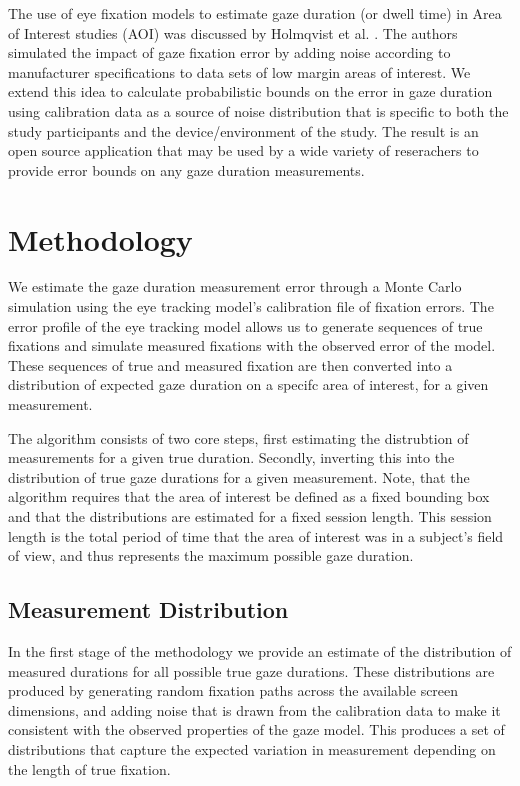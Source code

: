 \documentclass[sigconf]{acmart}
\numberwithin{equation}{section}
\begin{document}
The use of eye fixation models to estimate gaze duration (or dwell time) in Area of
Interest studies (AOI) was discussed by Holmqvist et al. \cite{Holmqvist2012}. The
authors simulated the impact of gaze fixation error by adding noise according to
manufacturer specifications to data sets of low margin areas of interest. We extend 
this idea to calculate probabilistic bounds on the error in gaze duration using
calibration data as a source of noise distribution that is specific to both the
study participants and the device/environment of the study. The result is an open
source application that may be used by a wide variety of reserachers to provide
error bounds on any gaze duration measurements.

\section{Methodology}

We estimate the gaze duration measurement error through a Monte Carlo simulation
using the eye tracking model's calibration file of fixation errors.
The error profile of the eye tracking model allows us to generate sequences of true
fixations and simulate measured fixations with the observed error of the model.
These sequences of true and measured fixation are then converted into a distribution
of expected gaze duration on a specifc area of interest, for a given measurement. 

The algorithm consists of two core steps, first estimating the distrubtion of measurements
for a given true duration. Secondly, inverting this into the distribution of true
gaze durations for a given measurement. Note, that the algorithm requires that the area of
interest be defined as a fixed bounding box and that the distributions are estimated for
a fixed session length. This session length is the total period of time that the area of
interest was in a subject's field of view, and thus represents the maximum possible gaze
duration.

\subsection{Measurement Distribution}

In the first stage of the methodology we provide an estimate of the distribution of measured
durations for all possible true gaze durations. These distributions are produced by generating
random fixation paths across the available screen dimensions, and adding noise that is 
drawn from the calibration data to make it consistent with the observed properties of the gaze model.
This produces a set of distributions that capture the expected
variation in measurement depending on the length of true fixation.
\end{document}
